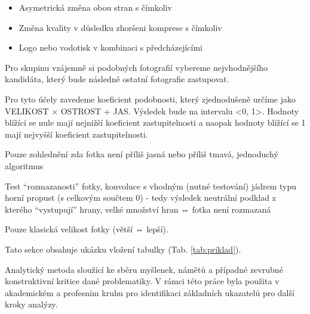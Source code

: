 \begin{itemize}
	\setlength{\parskip}{0pt}
	\setlength{\itemsep}{0pt}
	\item {Asymetrická změna obou stran s čímkoliv}
	\item {Změna kvality v důsledku zhoršeni komprese s čímkoliv}
	\item {Logo nebo vodotisk v kombinaci s předcházejícími}
\end{itemize}

Pro skupinu vzájemně si podobných fotografií vybereme nejvhodnějšího kandidáta, který bude následně ostatní fotografie zastupovat.

Pro tyto účely zavedeme koeficient podobnosti, který zjednodušeně určíme jako VELIKOST × OSTROST + JAS. Výsledek bude na intervalu <0, 1>. Hodnoty blížící se nule mají nejnižší koeficient zastupitelnosti a naopak hodnoty blížící se 1 mají nejvyšší koeficient zastupitelnosti. 


Pouze zohlednění zda fotka není příliš jasná nebo příliš tmavá, jednoduchý algoritmus

Test “rozmazanosti” fotky, konvoluce s vhodným (nutné testování) jádrem typu horní propust (s celkovým součtem 0) - tedy výsledek neutrální podklad z kterého “vystupují” hrany, velké množství hran ⇔ fotka není rozmazaná

Pouze klasická velikost fotky (větší ⇔ lepší).


Tato sekce obsahuje ukázku vložení tabulky (Tab. \ref{tab:priklad}).





Analytický metoda sloužící ke sběru myšlenek, námětů a případné zevrubné konstruktivní kritice dané problematiky. V rámci této práce byla použita v akademickém a profesním kruhu pro identifikaci základních ukazatelů pro další kroky analýzy.

